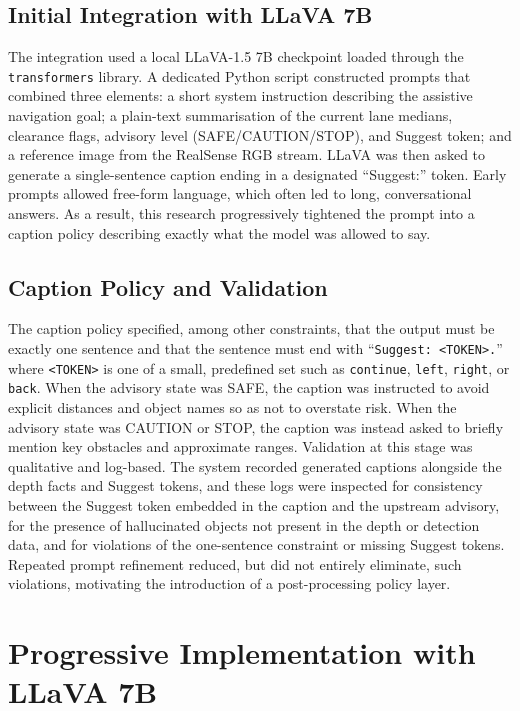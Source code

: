 \documentclass[11pt,a4paper]{article}
\newcommand{\code}[1]{\texttt{#1}}
\begin{document}
\subsection{Initial Integration with LLaVA 7B}

The integration used a local LLaVA-1.5 7B checkpoint loaded through the \code{transformers} library. A dedicated Python script constructed prompts that combined three elements: a short system instruction describing the assistive navigation goal; a plain-text summarisation of the current lane medians, clearance flags, advisory level (SAFE/CAUTION/STOP), and Suggest token; and a reference image from the RealSense RGB stream. LLaVA was then asked to generate a single-sentence caption ending in a designated ``Suggest:'' token. Early prompts allowed free-form language, which often led to long, conversational answers. As a result, this research progressively tightened the prompt into a caption policy describing exactly what the model was allowed to say.

\subsection{Caption Policy and Validation}

The caption policy specified, among other constraints, that the output must be exactly one sentence and that the sentence must end with ``\code{Suggest: <TOKEN>.}'' where \code{<TOKEN>} is one of a small, predefined set such as \code{continue}, \code{left}, \code{right}, or \code{back}. When the advisory state was SAFE, the caption was instructed to avoid explicit distances and object names so as not to overstate risk. When the advisory state was CAUTION or STOP, the caption was instead asked to briefly mention key obstacles and approximate ranges. Validation at this stage was qualitative and log-based. The system recorded generated captions alongside the depth facts and Suggest tokens, and these logs were inspected for consistency between the Suggest token embedded in the caption and the upstream advisory, for the presence of hallucinated objects not present in the depth or detection data, and for violations of the one-sentence constraint or missing Suggest tokens. Repeated prompt refinement reduced, but did not entirely eliminate, such violations, motivating the introduction of a post-processing policy layer.

\section{Progressive Implementation with LLaVA 7B}
\end{document}
